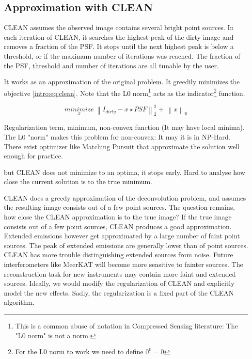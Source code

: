 \subsection{Approximation with CLEAN}
CLEAN assumes the observed image contains several bright point sources. In each iteration of CLEAN, it searches the highest peak of the dirty image and removes a fraction of the PSF. It stops until the next highest peak is below a threshold, or if the maximum number of iterations was reached. The fraction of the PSF, threshold and number of iterations are all tunable by the user.

It works as an approximation of the original problem. It greedily minimizes the objective \eqref{intro:eq:clean}. 
Note that the L0 norm\footnote{This is a common abuse of notation in Compressed Sensing literature: The "L0 norm" is not a norm.} acts as the indicator\footnote{For the L0 norm to work we need to define $0^0 = 0$} function.

\begin{equation}\label{intro:eq:clean}
\underset{x}{minimize} \: \left \| I_{dirty} - x \star PSF \right \|_2^2 + \: \left \| x \right \|_0
\end{equation}

Regularization term, minimum, non-convex function (It may have local minima). 
The L0 "norm" makes this problem for non-convex: It may  it is in NP-Hard. There exist optimizer like Matching Pursuit that approximate the solution well enough for practice.

but CLEAN does not minimize to an optima, it stops early. Hard to analyse how close the current solution is to the true minimum.


CLEAN does a greedy approximation of the deconvolution problem, and assumes the resulting image consists out of a few point sources. The question remains, how close the CLEAN approximation is to the true image? If the true image consists out of a few point sources, CLEAN produces a good approximation. Extended emissions however get approximated by a large number of faint point sources. The peak of extended emissions are generally lower than of point sources. CLEAN has more trouble distinguishing extended sources from noise. Future interferometers like MeerKAT will become more sensitive to fainter sources. The reconstruction task for new instruments may contain more faint and extended sources. Ideally, we would modify the regularization of CLEAN and explicitly model the new effects. Sadly, the regularization is a fixed part of the CLEAN algorithm.



